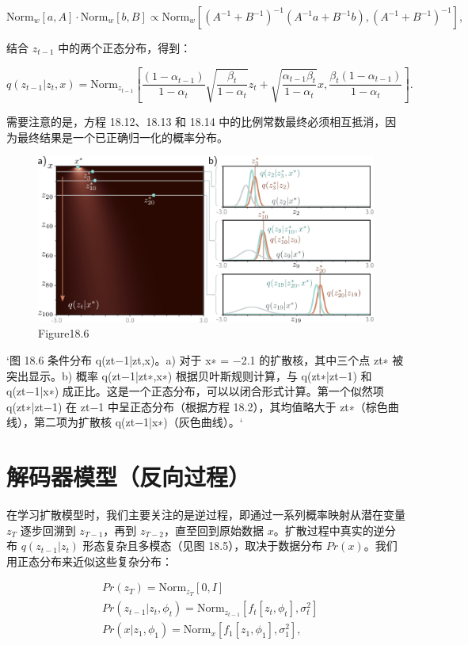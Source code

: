 \begin{equation}
\text{Norm}_{w}[a, A] \cdot \text{Norm}_{w}[b, B] \propto \text{Norm}_{w} \left[ (A^{-1} + B^{-1})^{-1} (A^{-1} a + B^{-1} b), (A^{-1} + B^{-1})^{-1} \right], 
\end{equation}

结合 \(z_{t-1}\) 中的两个正态分布，得到：

\begin{equation}
q(z_{t-1}|z_t, x) = \text{Norm}_{z_{t-1}} \left[
\frac{(1 - \alpha_{t-1})}{1 - \alpha_t} \sqrt{\frac{\beta_t}{1 - \alpha_t}} z_t + \sqrt{\frac{\alpha_{t-1}\beta_t}{1 - \alpha_t}} x, 
\frac{\beta_t (1 - \alpha_{t-1})}{1 - \alpha_t} 
\right]. 
\end{equation}

需要注意的是，方程 18.12、18.13 和 18.14 中的比例常数最终必须相互抵消，因为最终结果是一个已正确归一化的概率分布。

\begin{figure}[ht!]
\centering
\includegraphics[width=0.7\linewidth]{png/chapter18/DiffusionReverseConditional.png}
\caption{Figure18.6}
\end{figure}

`图 18.6 条件分布 q(zt−1|zt,x)。a) 对于 x∗ = −2.1 的扩散核，其中三个点 zt∗ 被突出显示。b) 概率 q(zt−1|zt∗,x∗) 根据贝叶斯规则计算，与 q(zt∗|zt−1) 和 q(zt−1|x∗) 成正比。这是一个正态分布，可以以闭合形式计算。第一个似然项 q(zt∗|zt−1) 在 zt−1 中呈正态分布（根据方程 18.2），其均值略大于 zt∗（棕色曲线），第二项为扩散核 q(zt−1|x∗)（灰色曲线）。`

\section{解码器模型（反向过程）}
在学习扩散模型时，我们主要关注的是逆过程，即通过一系列概率映射从潜在变量 \(z_T\) 逐步回溯到 \(z_{T-1}\)，再到 \(z_{T-2}\)，直至回到原始数据 \(x\)。扩散过程中真实的逆分布 \(q(z_{t-1}|z_t)\) 形态复杂且多模态（见图 18.5），取决于数据分布 \(Pr(x)\)。我们用正态分布来近似这些复杂分布：


\begin{align}
&Pr(z_T) = \text{Norm}_{z_T}[0, I] \\
&Pr(z_{t-1}|z_t, \phi_t) = \text{Norm}_{z_{t-1}}[f_t[z_t, \phi_t], \sigma_t^2] \\
&Pr(x|z_1, \phi_1) = \text{Norm}_{x}[f_1[z_1, \phi_1], \sigma_1^2], 
\end{align} 


